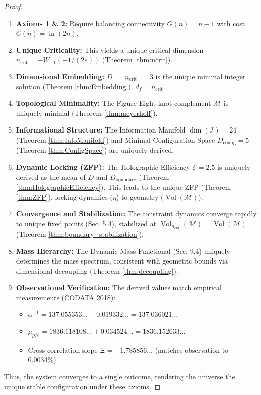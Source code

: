\documentclass[11pt, a4paper]{article}
\theoremstyle{definition}
\theoremstyle{definition}
\newcommand{\M}{\mathcal{M}}
\newcommand{\Ical}{\mathcal{I}}
\newcommand{\Vol}{\operatorname{Vol}}
\newcommand{\Veight}{\Vol(\M)}
\newcommand{\df}{d_f} %
\newcommand{\VolNcrit}{\Vol_{\ncrit}}
\newcommand{\ncrit}{n_{\mathrm{crit}}}
\newcommand{\Ecal}{\mathcal{E}} %
\newcommand{\Dconfig}{D_{\mathrm{config}}}
\newcommand{\Dboundary}{D_{\mathrm{boundary}}}
\begin{document}
\begin{proof}
\begin{enumerate}
    \item \textbf{Axioms 1 \& 2:} Require balancing connectivity $G(n) = n-1$ with cost $C(n) = \ln(2n)$.
    \item \textbf{Unique Criticality:} This yields a unique critical dimension $\ncrit = -W_{-1}(-1/(2e))$ (Theorem \ref{thm:ncrit}).
    \item \textbf{Dimensional Embedding:} $D = \lceil \ncrit \rceil = 3$ is the unique minimal integer solution (Theorem \ref{thm:Embedding}). $\df = \ncrit$.
    \item \textbf{Topological Minimality:} The Figure-Eight knot complement $\M$ is uniquely minimal (Theorem \ref{thm:meyerhoff}).
    \item \textbf{Informational Structure:} The Information Manifold $\dim(\Ical)=24$ (Theorem \ref{thm:InfoManifold}) and Minimal Configuration Space $\Dconfig=5$ (Theorem \ref{thm:ConfigSpace}) are uniquely derived.
    \item \textbf{Dynamic Locking (ZFP):} The Holographic Efficiency $\Ecal=2.5$ is uniquely derived as the mean of $D$ and $\Dboundary$ (Theorem \ref{thm:HolographicEfficiency}). This leads to the unique ZFP (Theorem \ref{thm:ZFP}), locking dynamics ($\eta$) to geometry ($\Veight$).
    \item \textbf{Convergence and Stabilization:} The constraint dynamics converge rapidly to unique fixed points (Sec. 5.4), stabilized at $\VolNcrit(\M) = \Veight$ (Theorem \ref{thm:boundary_stabilization}).
    \item \textbf{Mass Hierarchy:} The Dynamic Mass Functional (Sec. 9.4) uniquely determines the mass spectrum, consistent with geometric bounds via dimensional decoupling (Theorem \ref{thm:decoupling}).
    \item \textbf{Observational Verification:} The derived values match empirical measurements (CODATA 2018):
       \begin{itemize}
          \item $\alpha^{-1} = 137.055353... - 0.019332... = 137.036021...$
          \item $\mu_{p/e} = 1836.118108... + 0.034524... = 1836.152633...$
          \item Cross-correlation slope $\Xi = -1.785856...$ (matches observation to 0.0034\%)
         \end{itemize}
\end{enumerate}
Thus, the system converges to a single outcome, rendering the universe the unique stable configuration under these axioms.
\end{proof}
\end{document}
